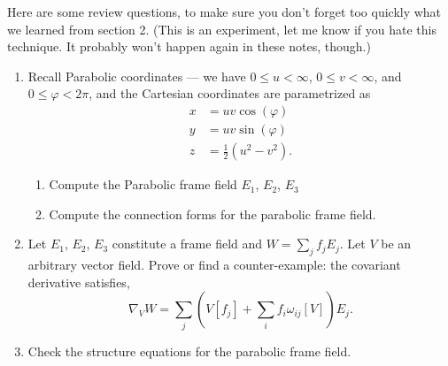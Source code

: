 

Here are some review questions, to make sure you don't forget too
quickly what we learned from section 2. (This is an experiment, let me
know if you hate this technique. It probably won't happen again in these
notes, though.)

\begin{enumerate}
\item Recall Parabolic coordinates --- we have $0\leq u<\infty$,
$0\leq v<\infty$, and $0\leq\varphi<2\pi$, and the Cartesian coordinates
  are parametrized as
  \begin{subequations}
    \begin{align}
      x &= uv\cos(\varphi)\\
      y &= uv\sin(\varphi)\\
      z &= \frac{1}{2}(u^{2}-v^{2}).
    \end{align}
  \end{subequations}
  \begin{enumerate}
  \item Compute the Parabolic frame field $E_{1}$, $E_{2}$, $E_{3}$
  \item Compute the connection forms for the parabolic frame field.
  \end{enumerate}
\item Let $E_{1}$, $E_{2}$, $E_{3}$ constitute a frame field and
  $W=\sum_{j}f_{j}E_{j}$. Let $V$ be an arbitrary vector field.
  Prove or find a counter-example: the covariant derivative satisfies,
\begin{equation}
\nabla_{V}W = \sum_{j}\left(V[f_{j}] + \sum_{i}f_{i}\omega_{ij}[V]\right)E_{j}.
\end{equation}
\item Check the structure equations for the parabolic frame field.
\end{enumerate}
\vfill\eject

